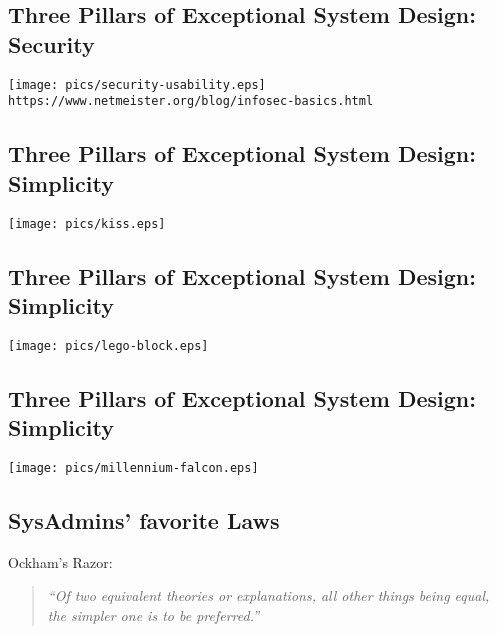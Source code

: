 \documentclass[xga]{xdvislides}
\newcommand{\smallish}{\fontsize{18}{18}\selectfont}
\begin{document}
\subsection{Three Pillars of Exceptional System Design: Security}
\vspace*{\fill}
\begin{center}
    \texttt{[image: pics/security-usability.eps]} \\
	\small
	{\tt https://www.netmeister.org/blog/infosec-basics.html}
	\Normalsize
\end{center}
\vspace*{\fill}

\subsection{Three Pillars of Exceptional System Design: Simplicity}
\vspace*{\fill}
\begin{center}
    \texttt{[image: pics/kiss.eps]} \\
\end{center}
\vspace*{\fill}

\subsection{Three Pillars of Exceptional System Design: Simplicity}
\vspace*{\fill}
\begin{center}
    \texttt{[image: pics/lego-block.eps]}
\end{center}
\vspace*{\fill}

\subsection{Three Pillars of Exceptional System Design: Simplicity}
\vspace*{\fill}
\begin{center}
    \texttt{[image: pics/millennium-falcon.eps]} \\
\end{center}
\vspace*{\fill}

\subsection{SysAdmins' favorite Laws}
\smallish
Ockham's Razor:
\begin{quote}
{\em ``Of two equivalent theories or explanations, all other things being
equal, the simpler one is to be preferred.''}
\end{quote}
\Normalsize
\end{document}

